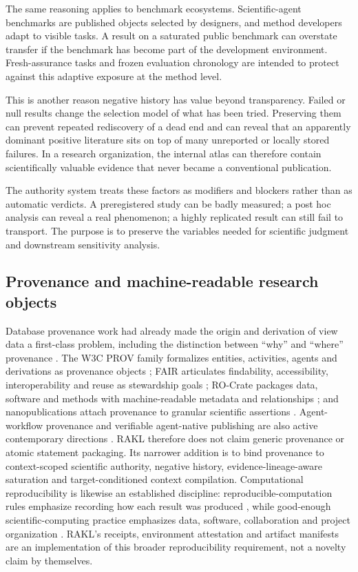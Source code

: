 The same reasoning applies to benchmark ecosystems. Scientific-agent benchmarks are published objects selected by designers, and method developers adapt to visible tasks. A result on a saturated public benchmark can overstate transfer if the benchmark has become part of the development environment. Fresh-assurance tasks and frozen evaluation chronology are intended to protect against this adaptive exposure at the method level.

This is another reason negative history has value beyond transparency. Failed or null results change the selection model of what has been tried. Preserving them can prevent repeated rediscovery of a dead end and can reveal that an apparently dominant positive literature sits on top of many unreported or locally stored failures. In a research organization, the internal atlas can therefore contain scientifically valuable evidence that never became a conventional publication.

The authority system treats these factors as modifiers and blockers rather than as automatic verdicts. A preregistered study can be badly measured; a post hoc analysis can reveal a real phenomenon; a highly replicated result can still fail to transport. The purpose is to preserve the variables needed for scientific judgment and downstream sensitivity analysis.

\subsection{Provenance and machine-readable research objects}
Database provenance work had already made the origin and derivation of view data a first-class problem, including the distinction between ``why'' and ``where'' provenance \cite{buneman2001}. The W3C PROV family formalizes entities, activities, agents and derivations as provenance objects \cite{moreau2013}; FAIR articulates findability, accessibility, interoperability and reuse as stewardship goals \cite{wilkinson2016}; RO-Crate packages data, software and methods with machine-readable metadata and relationships \cite{soilandreyes2022}; and nanopublications attach provenance to granular scientific assertions \cite{kuhn2018}. Agent-workflow provenance and verifiable agent-native publishing are also active contemporary directions \cite{souza2025,dogah2026}. RAKL therefore does not claim generic provenance or atomic statement packaging. Its narrower addition is to bind provenance to context-scoped scientific authority, negative history, evidence-lineage-aware saturation and target-conditioned context compilation. Computational reproducibility is likewise an established discipline: reproducible-computation rules emphasize recording how each result was produced \cite{sandve2013}, while good-enough scientific-computing practice emphasizes data, software, collaboration and project organization \cite{wilson2017}. RAKL's receipts, environment attestation and artifact manifests are an implementation of this broader reproducibility requirement, not a novelty claim by themselves.

